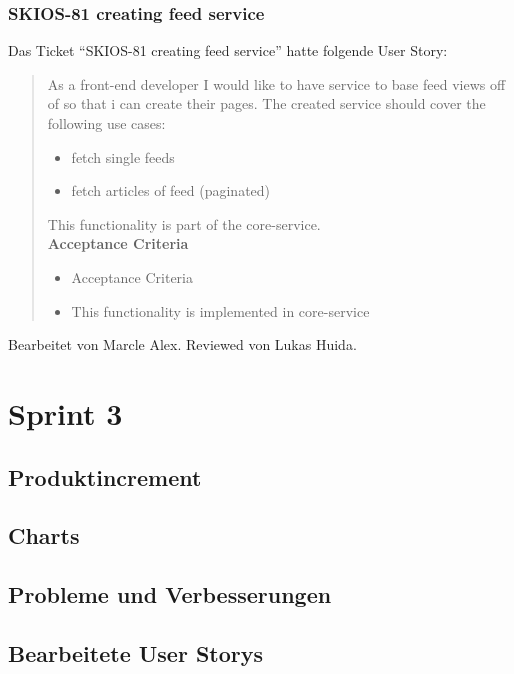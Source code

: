 \subsubsection{SKIOS-81 creating feed service}
Das Ticket \enquote{SKIOS-81 creating feed service} hatte folgende User Story:
\begin{quotation}
As a front-end developer I would like to have service to base feed views off of so that i can create their pages.
The created service should cover the following use cases:
\begin{itemize}
    \item fetch single feeds
    \item fetch articles of feed (paginated)
\end{itemize}
This functionality is part of the core-service.\\
\textbf{Acceptance Criteria}
\begin{itemize}
    \item Acceptance Criteria
    \item This functionality is implemented in core-service
\end{itemize}
\end{quotation}
Bearbeitet von Marcle Alex.
Reviewed von Lukas Huida.

\section{Sprint 3}

\subsection{Produktincrement}
\subsection{Charts}
\subsection{Probleme und Verbesserungen}

\subsection{Bearbeitete User Storys}

